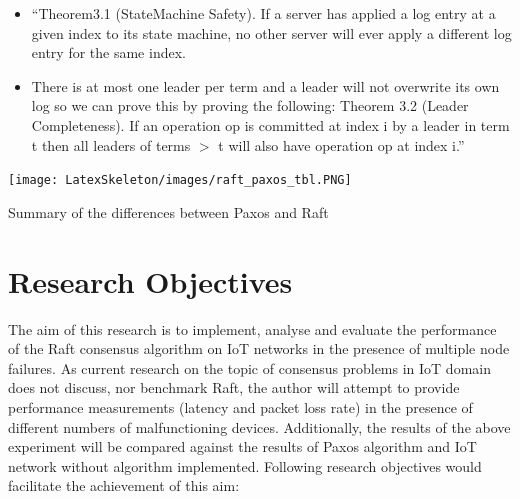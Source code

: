 \documentclass[oneside,12pt]{book}
\begin{document}
\begin{itemize}
  \item “Theorem3.1 (StateMachine Safety). If a server has applied a log entry at a given index to its state machine, no other server will ever apply a different log entry for the same index.
  
  \item There is at most one leader per term and a leader will not overwrite its own log so we can prove this by proving the following:\smallskip \newline
  Theorem 3.2 (Leader Completeness). If an operation op is committed at index i by a leader in term t then all leaders of terms $>$ t will also have operation op at index i.”
  
\end{itemize}

\begin{table}[H]
  \centering
  \label{tbl:Summary of the differences between Paxos and Raft}
  \texttt{[image: LatexSkeleton/images/raft\_paxos\_tbl.PNG]}
  \caption{Summary of the differences between Paxos and Raft}
\end{table}



\section{Research Objectives}
The aim of this research is to implement, analyse and evaluate the performance of the Raft consensus algorithm on IoT networks in the presence of multiple node failures. As current research on the topic of consensus problems in IoT domain does not discuss, nor benchmark Raft, the author will attempt to provide performance measurements (latency and packet loss rate) in the presence of different numbers of malfunctioning devices. Additionally, the results of the above experiment will be compared against the results of Paxos algorithm and IoT network without algorithm implemented.
Following research objectives would facilitate the achievement of this aim:
\end{document}
